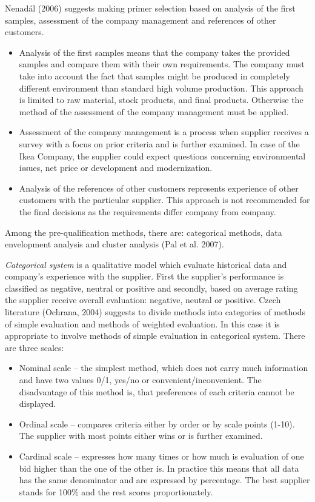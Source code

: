 \documentclass[oneside,12pt]{article}%
\begin{document}
Nenad\'{a}l (2006) suggests making primer selection based on analysis of the first samples, assessment of the company management and references of other customers.
\begin{itemize}
  \item Analysis of the first samples means that the company takes the provided samples and compare them with their own requirements. The company must take into account the fact that samples might be produced in completely different environment than standard high volume production. This approach is limited to raw material, stock products, and final products. Otherwise the method of the assessment of the company management must be applied.
  \item Assessment of the company management is a process when supplier receives a survey with a focus on prior criteria and is further examined. In case of the Ikea Company, the supplier could expect questions concerning environmental issues, net price or development and modernization.
  \item Analysis of the references of other customers represents experience of other customers with the particular supplier. This approach is not recommended for the final decisions as the requirements differ company from company.

\end{itemize}


Among the pre-qualification methods, there are: categorical methods, data envelopment analysis and cluster analysis (Pal et al. 2007). \par
\emph{Categorical system} is a qualitative model which evaluate historical data and company’s experience with the supplier. First the supplier’s performance is classified as negative, neutral or positive and secondly, based on average rating the supplier receive overall evaluation: negative, neutral or positive. Czech literature (Ochrana, 2004) suggests to divide methods into categories of methods of simple evaluation and methods of weighted evaluation. In this case it is appropriate to involve methods of simple evaluation in categorical system. There are three scales:
\begin{itemize}
\item Nominal scale – the simplest method, which does not carry much information and have two values 0/1, yes/no or convenient/inconvenient. The disadvantage of this method is, that preferences of each criteria cannot be displayed.
\item Ordinal scale – compares criteria either by order or by scale points (1-10). The supplier with most points either wins or is further examined.
\item Cardinal scale – expresses how many times or how much is evaluation of one bid higher than the one of the other is. In practice this means that all data has the same denominator and are expressed by percentage. The best supplier stands for 100\% and the rest scores proportionately.
\end{itemize}
\end{document}
